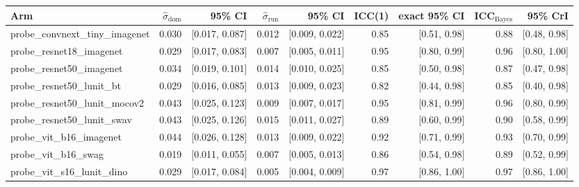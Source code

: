 \begin{tabular}{lrrrrrrrr}
\toprule
Arm & $\hat\sigma_\text{dom}$ & 95\% CI & $\hat\sigma_\text{run}$ & 95\% CI & ICC(1) & exact 95\% CI & ICC$_\text{Bayes}$ & 95\% CrI \\
\midrule
probe\_convnext\_tiny\_imagenet & 0.030 & [0.017, 0.087] & 0.012 & [0.009, 0.022] & 0.85 & [0.51, 0.98] & 0.88 & [0.48, 0.98] \\
probe\_resnet18\_imagenet & 0.029 & [0.017, 0.083] & 0.007 & [0.005, 0.011] & 0.95 & [0.80, 0.99] & 0.96 & [0.80, 1.00] \\
probe\_resnet50\_imagenet & 0.034 & [0.019, 0.101] & 0.014 & [0.010, 0.025] & 0.85 & [0.50, 0.98] & 0.87 & [0.47, 0.98] \\
probe\_resnet50\_lunit\_bt & 0.029 & [0.016, 0.085] & 0.013 & [0.009, 0.023] & 0.82 & [0.44, 0.98] & 0.85 & [0.40, 0.98] \\
probe\_resnet50\_lunit\_mocov2 & 0.043 & [0.025, 0.123] & 0.009 & [0.007, 0.017] & 0.95 & [0.81, 0.99] & 0.96 & [0.80, 0.99] \\
probe\_resnet50\_lunit\_swav & 0.043 & [0.025, 0.126] & 0.015 & [0.011, 0.027] & 0.89 & [0.60, 0.99] & 0.90 & [0.58, 0.99] \\
probe\_vit\_b16\_imagenet & 0.044 & [0.026, 0.128] & 0.013 & [0.009, 0.022] & 0.92 & [0.71, 0.99] & 0.93 & [0.70, 0.99] \\
probe\_vit\_b16\_swag & 0.019 & [0.011, 0.055] & 0.007 & [0.005, 0.013] & 0.86 & [0.54, 0.98] & 0.89 & [0.52, 0.99] \\
probe\_vit\_s16\_lunit\_dino & 0.029 & [0.017, 0.084] & 0.005 & [0.004, 0.009] & 0.97 & [0.86, 1.00] & 0.97 & [0.86, 1.00] \\
\bottomrule
\end{tabular}
